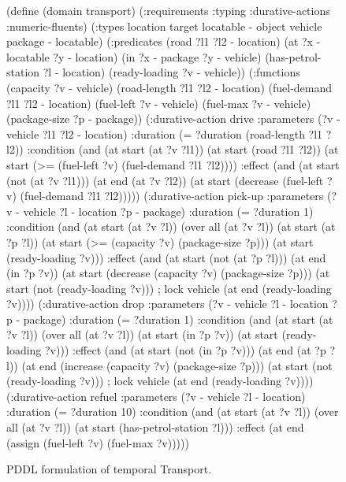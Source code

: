 \begin{figure}[tbp]
\begin{code}
(define (domain transport) 
  (:requirements :typing :durative-actions :numeric-fluents)
  (:types
        location target locatable - object
        vehicle package - locatable)
  (:predicates (road ?l1 ?l2 - location)
     (at ?x - locatable ?y - location) (in ?x - package ?y - vehicle)
     (has-petrol-station ?l - location) (ready-loading ?v - vehicle))
  (:functions (capacity ?v - vehicle) (road-length ?l1 ?l2 - location)
     (fuel-demand ?l1 ?l2 - location) (fuel-left ?v - vehicle)
     (fuel-max ?v - vehicle) (package-size ?p - package))
  (:durative-action drive
    :parameters (?v - vehicle ?l1 ?l2 - location)
    :duration (= ?duration (road-length ?l1 ?l2))
    :condition (and (at start (at ?v ?l1))
        (at start (road ?l1 ?l2))
        (at start (>= (fuel-left ?v) (fuel-demand ?l1 ?l2))))
    :effect (and (at start (not (at ?v ?l1)))
        (at end (at ?v ?l2))
        (at start (decrease (fuel-left ?v) (fuel-demand ?l1 ?l2)))))
  (:durative-action pick-up
    :parameters (?v - vehicle ?l - location ?p - package)
    :duration (= ?duration 1)
    :condition (and (at start (at ?v ?l))
        (over all (at ?v ?l))        (at start (at ?p ?l))
        (at start (>= (capacity ?v) (package-size ?p)))
        (at start (ready-loading ?v)))
    :effect (and (at start (not (at ?p ?l))) (at end (in ?p ?v))
        (at start (decrease (capacity ?v) (package-size ?p)))
        (at start (not (ready-loading ?v))) ; lock vehicle
        (at end (ready-loading ?v))))
  (:durative-action drop
    :parameters (?v - vehicle ?l - location ?p - package)
    :duration (= ?duration 1)
    :condition (and (at start (at ?v ?l))
        (over all (at ?v ?l))        (at start (in ?p ?v))
        (at start (ready-loading ?v)))
    :effect (and (at start (not (in ?p ?v)))
        (at end (at ?p ?l))
        (at end (increase (capacity ?v) (package-size ?p)))
        (at start (not (ready-loading ?v))) ; lock vehicle
        (at end (ready-loading ?v))))
  (:durative-action refuel
    :parameters (?v - vehicle ?l - location)
    :duration (= ?duration 10)
    :condition (and (at start (at ?v ?l))
        (over all (at ?v ?l)) (at start (has-petrol-station ?l)))
    :effect (at end (assign (fuel-left ?v) (fuel-max ?v)))))
\end{code}
\caption{PDDL formulation of temporal Transport.}
\label{code:pddl-temporal}
\end{figure}









